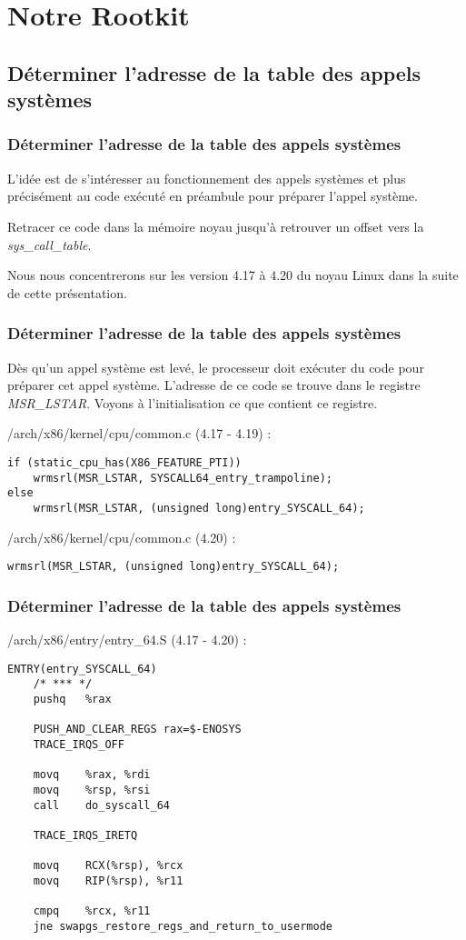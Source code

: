 \documentclass{beamer}
\begin{document}
\section{Notre Rootkit}
\subsection{Déterminer l'adresse de la table des appels systèmes}

\begin{frame}
\frametitle{Déterminer l'adresse de la table des appels systèmes}
L'idée est de s'intéresser au fonctionnement des appels systèmes et plus précisément au code exécuté en préambule pour préparer l'appel système.

\medskip
Retracer ce code dans la mémoire noyau jusqu'à retrouver un offset vers la \textit{sys\_call\_table}.

\medskip
Nous nous concentrerons sur les version 4.17 à 4.20 du noyau Linux dans la suite de cette présentation.
\end{frame}

\begin{frame}[fragile]
\frametitle{Déterminer l'adresse de la table des appels systèmes}
Dès qu'un appel système est levé, le processeur doit exécuter du code pour préparer cet appel système. L'adresse de ce code se trouve dans le registre \textit{MSR\_LSTAR}. Voyons à l'initialisation ce que contient ce registre.

\medskip
/arch/x86/kernel/cpu/common.c (4.17 - 4.19) :
\begin{lstlisting}[style=CStyle]
if (static_cpu_has(X86_FEATURE_PTI))
	wrmsrl(MSR_LSTAR, SYSCALL64_entry_trampoline);
else
	wrmsrl(MSR_LSTAR, (unsigned long)entry_SYSCALL_64);
\end{lstlisting}

\medskip
/arch/x86/kernel/cpu/common.c (4.20) :
\begin{lstlisting}[style=CStyle]
wrmsrl(MSR_LSTAR, (unsigned long)entry_SYSCALL_64);
\end{lstlisting}
\end{frame}

\begin{frame}[fragile]
\frametitle{Déterminer l'adresse de la table des appels systèmes}
/arch/x86/entry/entry\_64.S (4.17 - 4.20) :
\begin{lstlisting}[style=CStyle]
ENTRY(entry_SYSCALL_64)
	/* *** */
	pushq	%rax

	PUSH_AND_CLEAR_REGS rax=$-ENOSYS
	TRACE_IRQS_OFF

	movq	%rax, %rdi
	movq	%rsp, %rsi
	call	do_syscall_64

	TRACE_IRQS_IRETQ

	movq	RCX(%rsp), %rcx
	movq	RIP(%rsp), %r11

	cmpq	%rcx, %r11
	jne	swapgs_restore_regs_and_return_to_usermode
\end{lstlisting}
\end{frame}
\end{document}
